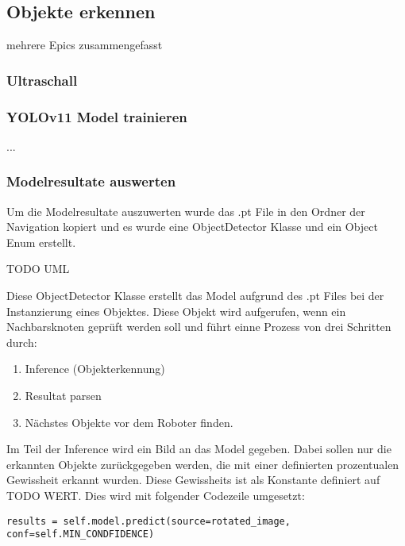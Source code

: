 
\subsection{Objekte erkennen}

mehrere Epics zusammengefasst 

\subsubsection{Ultraschall}

\subsubsection{YOLOv11 Model trainieren}

...

\subsubsection{Modelresultate auswerten}
\label{model-results}

Um die Modelresultate auszuwerten wurde das .pt File in den Ordner der Navigation kopiert und es wurde eine ObjectDetector Klasse und ein Object Enum erstellt.

TODO UML

Diese ObjectDetector Klasse erstellt das Model aufgrund des .pt Files bei der Instanzierung eines Objektes. Diese Objekt wird aufgerufen, wenn ein Nachbarsknoten geprüft werden soll und führt einne Prozess von drei Schritten durch:

\begin{enumerate}
    \item Inference (Objekterkennung)
    \item Resultat parsen
    \item Nächstes Objekte vor dem Roboter finden.
\end{enumerate}

Im Teil der Inference wird ein Bild an das Model gegeben. Dabei sollen nur die erkannten Objekte zurückgegeben werden, die mit einer definierten prozentualen Gewissheit erkannt wurden. Diese Gewissheits ist als Konstante definiert auf TODO WERT. Dies wird mit folgender Codezeile umgesetzt:
\begin{verbatim}
results = self.model.predict(source=rotated_image, conf=self.MIN_CONDFIDENCE)
\end{verbatim}

